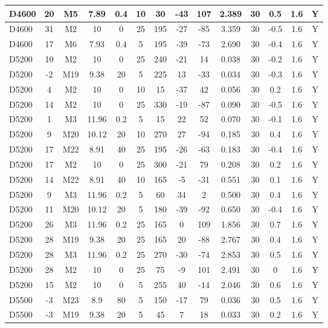 \documentclass{article}
\begin{document}
\begin{center}
\begin{longtable}{|l|c|c|c|c|c|c|c|c|c|c|c|c|c|}
D4600	&	20	&	M5	&	7.89	&	0.4	&	10	&	30	&	-43	&	107	&	2.389	&	30	&	0.5	&	1.6	&	Y	\\\hline
D4600	&	31	&	M2	&	10	&	0	&	25	&	195	&	-27	&	-85	&	3.359	&	30	&	-0.5	&	1.6	&	Y	\\\hline
D4600	&	17	&	M6	&	7.93	&	0.4	&	5	&	195	&	-39	&	-73	&	2.690	&	30	&	-0.4	&	1.6	&	Y	\\\hline
D5200	&	10	&	M2	&	10	&	0	&	25	&	240	&	-21	&	14	&	0.038	&	30	&	-0.2	&	1.6	&	Y	\\\hline
D5200	&	-2	&	M19	&	9.38	&	20	&	5	&	225	&	13	&	-33	&	0.034	&	30	&	-0.3	&	1.6	&	Y	\\\hline
D5200	&	4	&	M2	&	10	&	0	&	10	&	15	&	-37	&	42	&	0.056	&	30	&	0.2	&	1.6	&	Y	\\\hline
D5200	&	14	&	M2	&	10	&	0	&	25	&	330	&	-19	&	-87	&	0.090	&	30	&	-0.5	&	1.6	&	Y	\\\hline
D5200	&	1	&	M3	&	11.96	&	0.2	&	5	&	15	&	22	&	52	&	0.070	&	30	&	-0.1	&	1.6	&	Y	\\\hline
D5200	&	9	&	M20	&	10.12	&	20	&	10	&	270	&	27	&	-94	&	0.185	&	30	&	0.4	&	1.6	&	Y	\\\hline
D5200	&	17	&	M22	&	8.91	&	40	&	25	&	195	&	-26	&	-63	&	0.183	&	30	&	-0.4	&	1.6	&	Y	\\\hline
D5200	&	17	&	M2	&	10	&	0	&	25	&	300	&	-21	&	79	&	0.208	&	30	&	0.2	&	1.6	&	Y	\\\hline
D5200	&	14	&	M22	&	8.91	&	40	&	10	&	165	&	-5	&	-31	&	0.551	&	30	&	0.1	&	1.6	&	Y	\\\hline
D5200	&	9	&	M3	&	11.96	&	0.2	&	5	&	60	&	34	&	2	&	0.500	&	30	&	0.4	&	1.6	&	Y	\\\hline
D5200	&	11	&	M20	&	10.12	&	20	&	5	&	180	&	-39	&	-92	&	0.650	&	30	&	-0.4	&	1.6	&	Y	\\\hline
D5200	&	26	&	M3	&	11.96	&	0.2	&	25	&	165	&	0	&	109	&	1.856	&	30	&	0.7	&	1.6	&	Y	\\\hline
D5200	&	28	&	M19	&	9.38	&	20	&	25	&	165	&	20	&	-88	&	2.767	&	30	&	0.4	&	1.6	&	Y	\\\hline
D5200	&	28	&	M3	&	11.96	&	0.2	&	25	&	270	&	-30	&	-74	&	2.853	&	30	&	0.5	&	1.6	&	Y	\\\hline
D5200	&	28	&	M2	&	10	&	0	&	25	&	75	&	-9	&	101	&	2.491	&	30	&	0	&	1.6	&	Y	\\\hline
D5200	&	15	&	M2	&	10	&	0	&	5	&	255	&	40	&	-14	&	2.046	&	30	&	0.6	&	1.6	&	Y	\\\hline
D5500	&	-3	&	M23	&	8.9	&	80	&	5	&	150	&	-17	&	79	&	0.036	&	30	&	0.5	&	1.6	&	Y	\\\hline
D5500	&	-3	&	M19	&	9.38	&	20	&	5	&	45	&	7	&	18	&	0.033	&	30	&	0.2	&	1.6	&	Y	\\\hline

\end{longtable}
\end{center}
\end{document}

